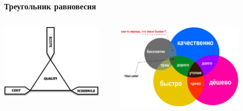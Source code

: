 \documentclass{../../slides-style}
\begin{document}
    \begin{frame}
        \frametitle{Треугольник равновесия}
        \begin{columns}
            \begin{column}{0.5\textwidth}
                \begin{center}
                    \includegraphics[width=0.9\textwidth]{balanceTriangle.png}
                \end{center}
            \end{column}
            \begin{column}{0.5\textwidth}
                \begin{center}
                    \includegraphics[width=0.9\textwidth]{balanceTriangleExplained.png}
                \end{center}
            \end{column}
        \end{columns}
    \end{frame}
\end{document}

